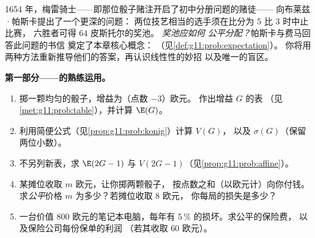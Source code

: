 \begin{problem}
\label{pb:g11:prob:1}
1654 年，梅雷骑士——即那位骰子赌注开启了初中分册问题的赌徒——
向布莱兹·帕斯卡提出了一个更深的问题：
两位技艺相当的选手须在比分为 $5$ 比 $3$ 时中止比赛，
六胜者可得 $64$ 皮斯托尔的奖池。
\emph{奖池应如何
公平分配？}帕斯卡与费马回答此问题的书信
奠定了本章核心概念：
（见\cref{def:g11:prob:expectation}）。
你将用两种方法重新推导他们的答案，再认识线性性的妙招
以及唯一的盲区。

\medskip
\noindent\textbf{第一部分——的熟练运用。}
\begin{enumerate}
  \item 掷一颗均匀的骰子，增益为（点数 $- 3$）欧元。
        作出增益 $G$ 的表
        （见\cref{met:g11:prob:table}），并计算 $\E(G)$。
  \item 利用简便公式（见\cref{prop:g11:prob:konig}）计算 $V(G)$，
        以及 $\sigma(G)$（保留
        两位小数）。
  \item 不另列新表，求 $\E(2G - 1)$ 与
        $V(2G - 1)$（见\cref{prop:g11:prob:affine}）。
  \item 某摊位收取 $m$ 欧元，让你掷两颗骰子，
        按点数之和（以欧元计）向你付钱。求\emph{公平}价格
        $m$ 为多少？若摊位收取 $8$ 欧元，
        你每局的损失是多少？
  \item 一台价值 $800$ 欧元的笔记本电脑，每年有
        $5\,\%$ 的损坏。求公平的保险费，
        以及保险公司每份保单的利润
        （若其收取 $60$ 欧元）。
\end{enumerate}


\end{problem}
